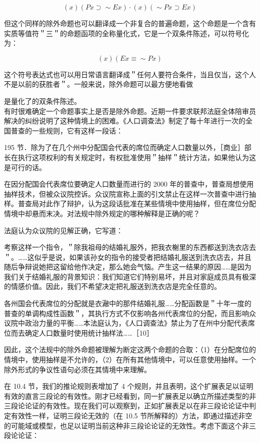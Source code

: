 $$
(x)(P x \supset \sim E x) \cdot(x)(\sim P x \supset E x)
$$

但这个同样的除外命题也可以翻译成一个非复合的普遍命题，这个命题是一个含有实质等值符＂三＂的命题函项的全称量化式，它是一个双条件陈述，可以符号化为：

$$
(x)(E x \equiv \sim P x)
$$

这个符号表达式也可以用日常语言翻译成＂任何人要符合条件，当且仅当，这个人不是以前的获胜者＂。一般来说，除外命题可以最方便地看做

是量化了的双条件陈述。\\
有时很难确定一个命题事实上是否是除外命题。近期一件要求联邦法庭全体陪审员解决的纠纷说明了这种情境上的困难。《人口调查法》制定了每十年进行一次的全国普查的一些规则，它有这样一段话：

195 节．除为了在几个州中分配国会代表的席位而确定人口数量以外，［商业］部长在执行这项权利的有关规定时，有权批准使用＂抽样＂统计方法，如果他认为这是可行的话。

在因分配国会代表席位要确定人口数量而进行的 2000 年的普查中，普查局想使用抽样技术，但被众议院控诉。众议院宣称上面的引文禁止在这样一次普查中进行抽样。普查局对此作了辩护，认为这段话批准在某些情境中使用抽样，但在席位分配情境中却悬而末决。对法规中除外规定的哪种解释是正确的呢？

法庭认为众议院的见解正确，它写道：

考察这样一个指令，＂除我祖母的结婚礼服外，把我衣榭里的东西都送到洗衣店去＂。……这似乎是说，如果该孙女的指令的接受者把结婚礼服送到洗衣店去，并且随后争辩说她把这留给他作决定，那么她会气恼。产生这一结果的原因……是因为我们关于结婚礼服的背景知识：我们知道它们特别易坏，并且对家庭成员具有极深的情感价值。因此，我们不希望决定把礼服送到洗衣店是完全任意的。

各州国会代表席位的分配就是衣瀜中的那件结婚礼服……分配函数是＂十年一度的普查的单调构成性函数＂，其执行方式不仅影响各州代表席位的分配，而且影响众议院中政治力量的平衡……本法庭认为，《人口调查法》禁止为了在州中分配代表席位而去确定人口数量时使用统计抽样法……［10］

因此，这个法规中的除外命题被理解为断定这两个命题的合取：（1）在分配席位的情境中，使用抽样是不允许的，（2）在所有其他情境中，可以任意使用抽样。一个除外形式的争议性语句必须在其情境中来理解。

在 10.4 节，我们的推论规则表增加了 4 个规则，并且表明，这个扩展表足以证明有效的直言三段论的有效性。刚才已经看到，同一扩展表足以确立所描述类型的非三段论论证的有效性。现在我们可以观察到，正如扩展表足以在非三段论论证中判定有效性一样，证明三段论无效的（在 10.5 节所解释的）方法，即通过描述非空的可能域或模型，也足以证明当前这种非三段论论证的无效性。考虑下面这个非三段论论证：

